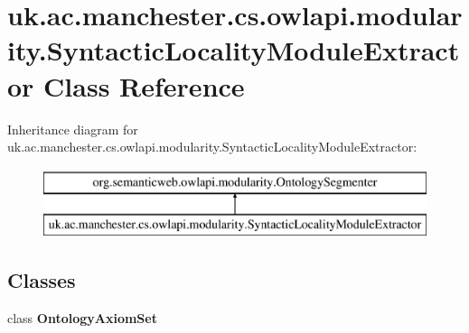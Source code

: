 \hypertarget{classuk_1_1ac_1_1manchester_1_1cs_1_1owlapi_1_1modularity_1_1_syntactic_locality_module_extractor}{\section{uk.\-ac.\-manchester.\-cs.\-owlapi.\-modularity.\-Syntactic\-Locality\-Module\-Extractor Class Reference}
\label{classuk_1_1ac_1_1manchester_1_1cs_1_1owlapi_1_1modularity_1_1_syntactic_locality_module_extractor}
}
Inheritance diagram for uk.\-ac.\-manchester.\-cs.\-owlapi.\-modularity.\-Syntactic\-Locality\-Module\-Extractor\-:\begin{figure}[H]
\begin{center}
\leavevmode
\includegraphics[height=2.000000cm]{classuk_1_1ac_1_1manchester_1_1cs_1_1owlapi_1_1modularity_1_1_syntactic_locality_module_extractor}
\end{center}
\end{figure}
\subsection*{Classes}
\begin{DoxyCompactItemize}
\item 
class {\bfseries Ontology\-Axiom\-Set}
\end{DoxyCompactItemize}
